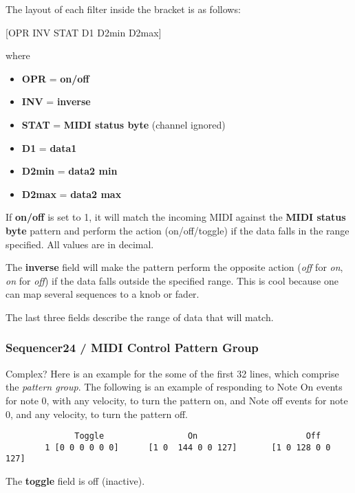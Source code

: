    The layout of each filter inside the bracket is as follows:

      [OPR INV STAT D1 D2min D2max]

   where

   \begin{itemize}
      \item \textbf{OPR} = \textbf{on/off}
      \item \textbf{INV} = \textbf{inverse}
      \item \textbf{STAT} = \textbf{MIDI status byte} (channel ignored) 
      \item \textbf{D1} = \textbf{data1}
      \item \textbf{D2min} = \textbf{data2 min}
      \item \textbf{D2max} = \textbf{data2 max}
   \end{itemize}

   If \textbf{on/off} is set to 1, it will match the incoming MIDI against
   the \textbf{MIDI status byte} pattern and perform the action
   (on/off/toggle) if the data falls in the range specified.  All values are
   in decimal.

	The \textbf{inverse} field will make the pattern perform the opposite 
   action (\textsl{off} for \textsl{on}, \textsl{on} for \textsl{off}) if
   the data falls outside the specified range.  This is cool because one can
   map several sequences to a knob or fader.

	The last three fields describe the range of data that will match.

\subsubsection{Sequencer24 / MIDI Control Pattern Group}
\label{subsubsec:seq24_rc_file_midi_control_pattern_group}

   Complex?  Here is an example for the some of the first 32 lines, which
   comprise the \textsl{pattern group}.
   The following is an example of responding
   to Note On events for note 0, with any velocity, to turn the pattern on,
   and Note off events for note 0, and any velocity, to turn the pattern
   off.

   \begin{verbatim}
	          Toggle                 On                      Off
        1 [0 0 0 0 0 0]      [1 0  144 0 0 127]       [1 0 128 0 0 127]
   \end{verbatim}

   The \textbf{toggle} field is off (inactive).

